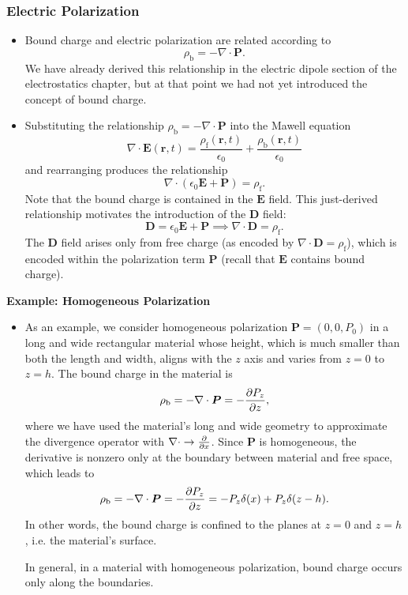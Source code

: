 \documentclass[11pt, a4paper]{article}
\renewcommand{\vec}[1]{\bm{#1}} %
\renewcommand{\r}{\vec{r}}
\newcommand{\E}{\vec{E}} %
\newcommand{\D}{\vec{D}}  %
\renewcommand{\P}{\vec{P}}  %
\newcommand{\ee}{\epsilon_{0}}  %
\renewcommand{\div}{\nabla \cdot}
\begin{document}
\subsubsection{Electric Polarization}
\begin{itemize}
	\item Bound charge and electric polarization are related according to
	\begin{equation*}
		\rho_{\text{b}} = - \div \P.
	\end{equation*}
    We have already derived this relationship in the electric dipole section of the electrostatics chapter, but at that point we had not yet introduced the concept of bound charge.
	
	\item Substituting the relationship $ \rho_{\text{b}} = - \div \P $ into the Mawell equation
    \begin{equation*}
		\div \E (\r, t) = \frac{\rho_{\text{f}}(\r, t)}{\ee} + \frac{\rho_{\text{b}}(\r, t)}{\ee}
    \end{equation*}
    and rearranging produces the relationship
	\begin{equation*}
		\div (\ee \E + \P) = \rho_{\text{f}}.
	\end{equation*}
	Note that the bound charge is contained in the $ \E $ field. This just-derived relationship motivates the introduction of the $ \D $ field:
	\begin{equation*}
		\D = \ee \E + \P \implies \div \D = \rho_{\text{f}}.
	\end{equation*}
    The $ \D $ field arises only from free charge (as encoded by $ \div \D = \rho_{\text{f}} $), which is encoded within the polarization term $ \P $ (recall that $ \E $ contains bound charge).
\end{itemize}
	
\textbf{Example: Homogeneous Polarization}
\begin{itemize}
	\item As an example, we consider homogeneous polarization $ \P = (0, 0, P_{0}) $ in a long and wide rectangular material whose height, which is much smaller than both the length and width, aligns with the $ z $ axis and varies from $ z = 0 $ to $ z = h $. The bound charge in the material is
	\begin{equation*}
		\rho_{\text{b}} = - \div \P = - \pdv{P_{z}}{z},
	\end{equation*}
    where we have used the material's long and wide geometry to approximate the divergence operator with $ \div \to \pdv{x} $. Since $ \P $ is homogeneous, the derivative is nonzero only at the boundary between material and free space, which leads to
	\begin{equation*}
		\rho_{\text{b}} = - \div \P = - \pdv{P_{z}}{z} = - P_{z}\delta(x) + P_{z}\delta(z - h).
	\end{equation*}
	In other words, the bound charge is confined to the planes at $ z = 0 $ and $ z = h $, i.e. the material's surface. 

    In general, in a material with homogeneous polarization, bound charge occurs only along the boundaries.
\end{itemize}
\end{document}
